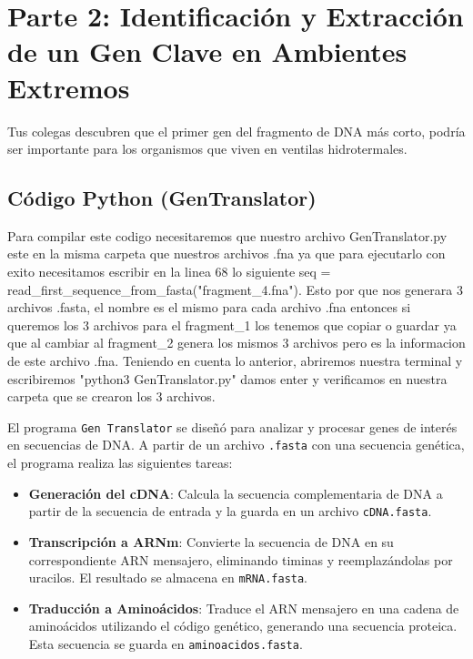 \section*{Parte 2: Identificación y Extracción de un Gen Clave en Ambientes Extremos} 
\label{sec:parte2} %

Tus colegas descubren que el primer gen del fragmento de DNA más corto, podría ser importante para los organismos que viven en ventilas hidrotermales.

\subsection*{Código Python (GenTranslator)}

Para compilar este codigo necesitaremos que nuestro archivo GenTranslator.py este en la misma carpeta que nuestros archivos .fna ya que para ejecutarlo con exito necesitamos escribir en la linea 68 lo siguiente seq = read_first_sequence_from_fasta("fragment_4.fna"). Esto por que nos generara 3 archivos .fasta, el nombre es el mismo para cada archivo .fna entonces si queremos los 3 archivos para el fragment_1 los tenemos que copiar o guardar ya que al cambiar al fragment_2 genera los mismos 3 archivos pero es la informacion de este archivo .fna.
Teniendo en cuenta lo anterior, abriremos nuestra terminal y escribiremos "python3 GenTranslator.py" damos enter y verificamos en nuestra carpeta que se crearon los 3 archivos.

El programa \texttt{Gen Translator} se diseñó para analizar y procesar genes de interés en secuencias de DNA. A partir de un archivo \texttt{.fasta} con una secuencia genética, el programa realiza las siguientes tareas:

\begin{itemize}
    \item \textbf{Generación del cDNA}: Calcula la secuencia complementaria de DNA a partir de la secuencia de entrada y la guarda en un archivo \texttt{cDNA.fasta}.
    \item \textbf{Transcripción a ARNm}: Convierte la secuencia de DNA en su correspondiente ARN mensajero, eliminando timinas y reemplazándolas por uracilos. El resultado se almacena en \texttt{mRNA.fasta}.
    \item \textbf{Traducción a Aminoácidos}: Traduce el ARN mensajero en una cadena de aminoácidos utilizando el código genético, generando una secuencia proteica. Esta secuencia se guarda en \texttt{aminoacidos.fasta}.
\end{itemize}

